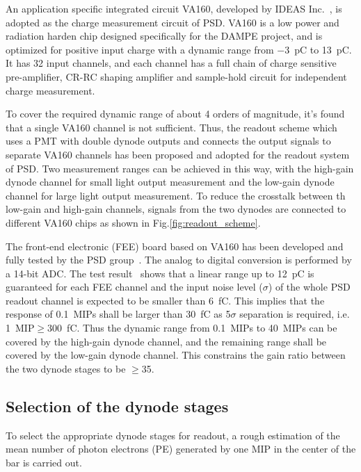 \documentclass[preprint, times]{elsarticle}
\begin{document}
An application specific integrated circuit VA160, developed by IDEAS Inc.~\cite{va160}, is adopted as the charge measurement circuit of PSD.
VA160 is a low power and radiation harden chip designed specifically for the DAMPE project, and is optimized for positive input charge  with a dynamic range from \SI{-3}{\pico\coulomb} to \SI{13}{\pico\coulomb}.
It has 32 input channels, and each channel has a full chain of charge sensitive pre-amplifier, CR-RC shaping amplifier and sample-hold circuit for independent charge measurement.

To cover the required dynamic range of about 4 orders of magnitude, it's found that a single VA160 channel is not sufficient. 
Thus, the readout scheme which uses a PMT with double dynode outputs and connects the output signals to separate VA160 channels has been proposed and adopted for the readout system of PSD. 
Two measurement ranges can be achieved in this way, with the high-gain dynode channel for small light output measurement and the low-gain dynode channel for large light output measurement. 
To reduce the crosstalk between th low-gain and high-gain channels, signals from the two dynodes are connected to different VA160 chips as shown in Fig.\ref{fig:readout_scheme}.

The front-end electronic (FEE) board based on VA160 has been developed and fully tested by the PSD group~\cite{fee}. 
The analog to digital conversion is performed by a 14-bit ADC. 
The test result~\cite{fee} shows that a linear range up to \SI{12}{\pico\coulomb} is guaranteed for each FEE channel and the input noise level ($\sigma$) of the whole PSD readout channel is expected to be smaller than \SI{6}{\femto\coulomb}. 
This implies that the response of \SI{0.1}{MIPs} shall be larger than \SI{30}{\femto\coulomb} as 5$\sigma$ separation is required, i.e. \SI{1}{MIP}$\geq$\SI{300}{\femto\coulomb}.
Thus the dynamic range from \SI{0.1}{MIPs} to \SI{40}{MIPs} can be covered by the high-gain dynode channel, and the remaining range shall be covered by the low-gain dynode channel.
This constrains the gain ratio between the two dynode stages to be $\geq$35.

\subsection{Selection of the dynode stages}
\label{sec:dynodes_selection}
To select the appropriate dynode stages for readout, a rough estimation of the mean number of photon electrons (PE) generated by one MIP in the center of the bar is carried out.
\end{document}
